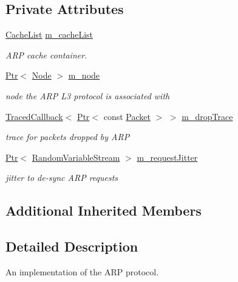 \subsection*{Private Attributes}
\begin{DoxyCompactItemize}
\item 
\hyperlink{classns3_1_1ArpL3Protocol_aae51f1ae2eb4bda375fb2f1fa4cc864a}{Cache\+List} \hyperlink{classns3_1_1ArpL3Protocol_a369682dd4e6568e6e5731d61147596c7}{m\+\_\+cache\+List}
\begin{DoxyCompactList}\small\item\em A\+RP cache container. \end{DoxyCompactList}\item 
\hyperlink{classns3_1_1Ptr}{Ptr}$<$ \hyperlink{classns3_1_1Node}{Node} $>$ \hyperlink{classns3_1_1ArpL3Protocol_aa1a2d173cfb3fd7e2f8eff8504a114da}{m\+\_\+node}
\begin{DoxyCompactList}\small\item\em node the A\+RP L3 protocol is associated with \end{DoxyCompactList}\item 
\hyperlink{classns3_1_1TracedCallback}{Traced\+Callback}$<$ \hyperlink{classns3_1_1Ptr}{Ptr}$<$ const \hyperlink{classns3_1_1Packet}{Packet} $>$ $>$ \hyperlink{classns3_1_1ArpL3Protocol_ac719ebd2b108a4d342741706669d74ad}{m\+\_\+drop\+Trace}
\begin{DoxyCompactList}\small\item\em trace for packets dropped by A\+RP \end{DoxyCompactList}\item 
\hyperlink{classns3_1_1Ptr}{Ptr}$<$ \hyperlink{classns3_1_1RandomVariableStream}{Random\+Variable\+Stream} $>$ \hyperlink{classns3_1_1ArpL3Protocol_a0d5144a236473eb6d7153600fdd7c5ee}{m\+\_\+request\+Jitter}
\begin{DoxyCompactList}\small\item\em jitter to de-\/sync A\+RP requests \end{DoxyCompactList}\end{DoxyCompactItemize}
\subsection*{Additional Inherited Members}


\subsection{Detailed Description}
An implementation of the A\+RP protocol. 

